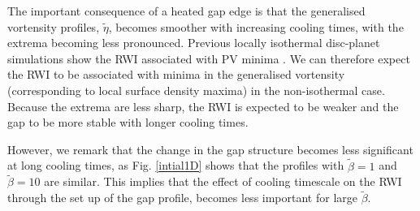 
The important consequence of a heated gap edge is that the
generalised vortensity profiles, $\tilde{\eta}$, becomes smoother with increasing
cooling times, with the extrema becoming less pronounced. Previous locally
isothermal disc-planet simulations show the RWI associated with PV
minima \citep{li05,lin10}. We can therefore expect the RWI to be associated with
minima in the generalised vortensity (corresponding to local surface
density maxima) in the non-isothermal case. Because the extrema are
less sharp, the RWI is expected to be weaker and the gap to be more
stable with longer cooling times.  


However, we remark that the change in the gap structure becomes less 
significant at long cooling times, as Fig. \ref{intial1D} shows that
the profiles with $\tilde{\beta}=1$ and $\tilde{\beta}=10$ are 
similar. This implies that the effect of cooling timescale on the
RWI through the set up of the gap profile, becomes less important for
large $\tilde{\beta}$. 

